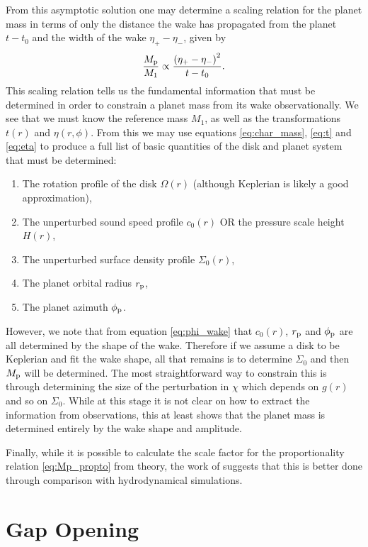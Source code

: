 From this asymptotic solution one may determine a scaling relation for the planet mass in terms of only the distance the wake has propagated from the planet $t-t_0$ and the width of the wake $\eta_+ - \eta_-$, given by 
\begin{align}
    \frac{M_{\rm p}}{M_1} \propto \frac{\left( \eta_+ - \eta_- \right)^2}{t - t_0}. \label{eq:Mp_propto}
\end{align}
This scaling relation tells us the fundamental information that must be determined in order to constrain a planet mass from its wake observationally.
We see that we must know the reference mass $M_1$, as well as the transformations $t(r)$ and $\eta(r,\phi)$.
From this we may use equations \ref{eq:char_mass}, \ref{eq:t} and \ref{eq:eta} to produce a full list of basic quantities of the disk and planet system that must be determined:
\begin{enumerate}
    \item The rotation profile of the disk $\Omega(r)$ (although Keplerian is likely a good approximation),
    \item The unperturbed sound speed profile $c_0(r)$ OR the pressure scale height $H(r)$,
    \item The unperturbed surface density profile $\Sigma_0(r)$,
    \item The planet orbital radius $r_{\rm p}$,
    \item The planet azimuth $\phi_{\rm p}$.
\end{enumerate}
However, we note that from equation \ref{eq:phi_wake} that $c_0(r)$, $r_{\rm p}$ and $\phi_{\rm p}$ are all determined by the shape of the wake.
Therefore if we assume a disk to be Keplerian and fit the wake shape, all that remains is to determine $\Sigma_0$ and then $M_{\rm p}$ will be determined.
The most straightforward way to constrain this is through determining the size of the perturbation in $\chi$ which depends on $g(r)$ and so on $\Sigma_0$.
While at this stage it is not clear on how to extract the information from observations, this at least shows that the planet mass is determined entirely by the wake shape and amplitude.

Finally, while it is possible to calculate the scale factor for the proportionality relation \ref{eq:Mp_propto} from theory, the work of \citet{cimerman2021} suggests that this is better done through comparison with hydrodynamical simulations.

\section{Gap Opening} \label{sec:gap_opening}

